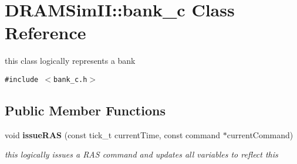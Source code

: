 \section{DRAMSimII::bank\_\-c Class Reference}
\label{class_d_r_a_m_sim_i_i_1_1bank__c}
this class logically represents a bank  


{\tt \#include $<$bank\_\-c.h$>$}

\subsection*{Public Member Functions}
\begin{CompactItemize}
\item 
void {\bf issueRAS} (const tick\_\-t currentTime, const command $\ast$currentCommand)\label{class_d_r_a_m_sim_i_i_1_1bank__c_e281749b11eb3f9301358e0efee4a337}

\begin{CompactList}\small\item\em this logically issues a RAS command and updates all variables to reflect this \item\end{CompactList}\end{CompactItemize}
